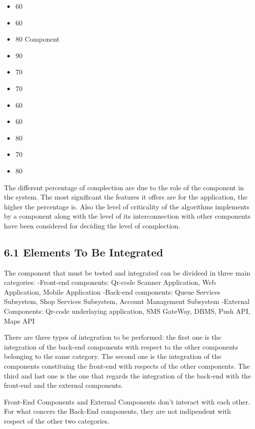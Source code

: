 \begin{itemize}
        \begin{itemize}
            \item 60%
            \item 60%
            \item 80%
            Component
            \item 90%
            \item 70%
            \item 70%
            \item  60%
            \item  60%
            \item 80%
            \item 70%
            \item 80%
        \end{itemize}
        The different percentage of complection are due to the role of the component in the system. The most significant the features it offers are for the application, the higher the percentage is. Also the level of criticality of the algorithms implements by a component along with the level of its interconnection with other components have been considered for deciding the level of complection.
\end{itemize}


\subsection{6.1 Elements To Be Integrated}
\label{subsect: entrycriteria}
The component that must be tested and integrated can be divideed in three main categories:
-Front-end components: Qr-code Scanner Application, Web Application, Mobile Application 
-Back-end components: Queue Services Subsystem, Shop Services Subsystem, Account Management Subsystem
-External Components: Qr-code underlaying application, SMS GateWay, DBMS, Push API, Maps API

There are three types of integration to be performed: the first one is the integration of the back-end components with respect to the other components belonging to the same category.
 The second one is the integration of the components constituing the front-end with respects of the other components.
 The third and last one is the one that regards the integration of the back-end with the front-end and the external components. 



Front-End Components and External Components don't interact with each other. For what concers the Back-End components, they are not indipendent with respect of the other two categories. 